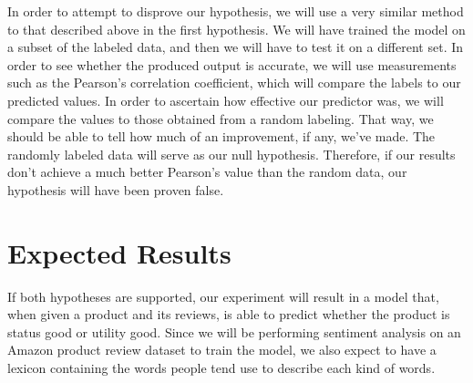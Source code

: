 \documentclass[dvips,12pt]{article}
\begin{document}
In order to attempt to disprove our hypothesis, we will use a very similar method to that described above in the first hypothesis. We will have trained the model on a subset of the labeled data, and then we will have to test it on a different set. In order to see whether the produced output is accurate, we will use measurements such as the Pearson’s correlation coefficient, which will compare the labels to our predicted values. In order to ascertain how effective our predictor was, we will compare the values to those obtained from a random labeling. That way, we should be able to tell how much of an improvement, if any, we’ve made. The randomly labeled data will serve as our null hypothesis. Therefore, if our results don’t achieve a much better Pearson’s value than the random data, our hypothesis will have been proven false.



\section{Expected Results}
If both hypotheses are supported, our experiment will result in a model that, when given a product and its reviews, is able to predict whether the product is status good or utility good. Since we will be performing sentiment analysis on an Amazon product review dataset to train the model, we also expect to have a lexicon containing the words people tend use to describe each kind of words. 





{}

\end{document}
